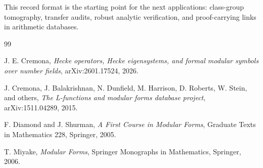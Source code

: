 \documentclass[11pt]{article}
\begin{document}
This record format is the starting point for the next applications: class-group tomography, transfer audits, robust analytic verification, and proof-carrying links in arithmetic databases.

\begin{thebibliography}{99}

J. E. Cremona,
\emph{Hecke operators, Hecke eigensystems, and formal modular symbols over number fields},
arXiv:2601.17524, 2026.

J. Cremona, J. Balakrishnan, N. Dunfield, M. Harrison, D. Roberts, W. Stein, and others,
\emph{The L-functions and modular forms database project},
arXiv:1511.04289, 2015.

F. Diamond and J. Shurman,
\emph{A First Course in Modular Forms},
Graduate Texts in Mathematics 228, Springer, 2005.

T. Miyake,
\emph{Modular Forms},
Springer Monographs in Mathematics, Springer, 2006.

\end{thebibliography}
\end{document}
